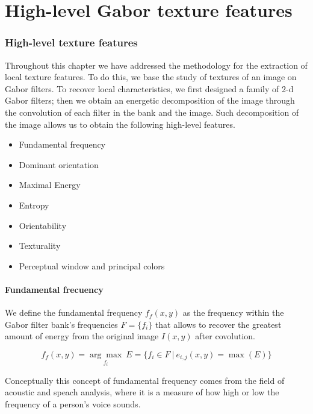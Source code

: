 
\chapter{High-level Gabor texture features}\label{ch:high_level_features}

\subsection*{High-level texture features}
Throughout this chapter we have addressed the methodology for the extraction of local texture features. To do this, we base the study of textures of an image on Gabor filters. To recover local characteristics, we first designed a family of 2-d Gabor filters; then we obtain an energetic decomposition of the image through the convolution of each filter in the bank and the image. Such decomposition of the image allows us to obtain the following high-level features.

\begin{itemize}
	\item Fundamental frequency
	\item Dominant orientation
	\item Maximal Energy
	\item Entropy
	\item Orientability
	\item Texturality 
	\item Perceptual window and principal colors
\end{itemize}

\subsubsection{Fundamental frecuency}
We define the fundamental frequency $f_{f}(x,y)$ as the frequency within the Gabor filter bank's frequencies $F=\lbrace f_i \rbrace$ that allows to recover the greatest amount of energy from the original image $I(x,y)$ after covolution. 

\begin{equation}
	f_{f}(x,y) =  \underset{f_{i}}{\arg\max} ~ E = \lbrace f_{i} \in F ~|~ e_{i,j}(x,y) = \max(E)\rbrace  \label{eq:fundamental_freq}
\end{equation}

Conceptually this concept of fundamental frequency comes from the field of acoustic and speach analysis, where it is a measure of how high or low the frequency of a person's voice sounds.

